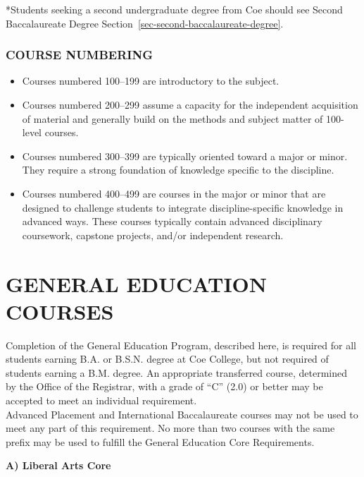 \documentclass[
  letterpaper,
]{scrbook}
\providecommand{\tightlist}{%
  \setlength{\itemsep}{0pt}\setlength{\parskip}{0pt}}
\begin{document}
*Students seeking a second undergraduate degree from Coe should see
Second Baccalaureate Degree
Section~\ref{sec-second-baccalaureate-degree}.

\subsection{COURSE NUMBERING}\label{course-numbering}

\begin{itemize}
\tightlist
\item
  Courses numbered 100--199 are introductory to the subject.
\item
  Courses numbered 200--299 assume a capacity for the independent
  acquisition of material and generally build on the methods and subject
  matter of 100-level courses.
\item
  Courses numbered 300--399 are typically oriented toward a major or
  minor. They require a strong foundation of knowledge specific to the
  discipline.
\item
  Courses numbered 400--499 are courses in the major or minor that are
  designed to challenge students to integrate discipline-specific
  knowledge in advanced ways. These courses typically contain advanced
  disciplinary coursework, capstone projects, and/or independent
  research.
\end{itemize}

\chapter{GENERAL EDUCATION COURSES}\label{sec-general-education-courses}

Completion of the General Education Program, described here, is required
for all students earning B.A. or B.S.N. degree at Coe College, but not
required of students earning a B.M. degree. An appropriate transferred
course, determined by the Office of the Registrar, with a grade of ``C''
(2.0) or better may be accepted to meet an individual requirement.\\
Advanced Placement and International Baccalaureate courses may not be
used to meet any part of this requirement. No more than two courses with
the same prefix may be used to fulfill the General Education Core
Requirements.

\textbf{A) Liberal Arts Core}
\end{document}
